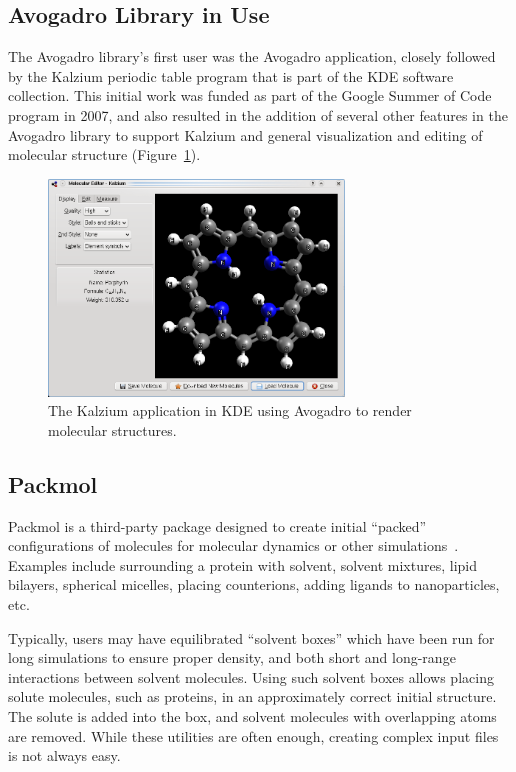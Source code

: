 \documentclass[10pt]{bmc_article}
\newenvironment{bmcformat}{\begin{raggedright}
\baselineskip20pt\sloppy\setboolean{publ}{false}}{\end{raggedright}
\baselineskip20pt\sloppy}
\begin{document}
\begin{bmcformat}
\section{Avogadro Library in Use}

The Avogadro library's first user was the Avogadro application, closely
followed by the Kalzium periodic table program that is part of the KDE software
collection. This initial work was funded as part of the Google Summer of Code
program in 2007, and also resulted in the addition of several other features in
the Avogadro library to support Kalzium and general visualization and editing
of molecular structure (Figure~\ref{f:kalzium}).

\begin{figure}
  \begin{center}
    \includegraphics[width=0.7\textwidth]{images/kalzium-porph}
  \end{center}
  \caption{The Kalzium application in KDE using Avogadro to render molecular structures.}
 \label{f:kalzium}
\end{figure}

\subsection{Packmol}

Packmol is a third-party package designed to create initial
``packed'' configurations of molecules for molecular dynamics or other
simulations~\cite{packmol}\cite{packmol-packing}. Examples include
surrounding a protein with solvent, solvent mixtures, lipid bilayers,
spherical micelles, placing counterions, adding ligands to
nanoparticles, etc.

Typically, users may have equilibrated ``solvent boxes'' which have
been run for long simulations to ensure proper density, and both short
and long-range interactions between solvent molecules. Using such
solvent boxes allows placing solute molecules, such as proteins, in an
approximately correct initial structure. The solute is added into the
box, and solvent molecules with overlapping atoms are removed. While
these utilities are often enough, creating complex input files is not
always easy.


\end{bmcformat}
\end{document}
